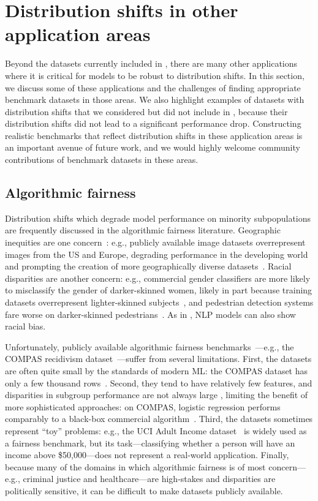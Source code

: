 \section{Distribution shifts in other application areas}\label{sec:other_datasets}
Beyond the datasets currently included in \Wilds,
there are many other applications where it is critical for models to be robust to distribution shifts.
In this section, we discuss some of these applications and the challenges of finding appropriate benchmark datasets in those areas.
We also highlight examples of datasets with distribution shifts that we considered but did not include in \Wilds, because their distribution shifts did not lead to a significant performance drop.
Constructing realistic benchmarks that reflect distribution shifts in these application areas is an important avenue of future work,
and we would highly welcome community contributions of benchmark datasets in these areas.

\subsection{Algorithmic fairness}\label{sec:fairness}
Distribution shifts which degrade model performance on minority subpopulations are frequently discussed in the algorithmic fairness literature.
Geographic inequities are one concern~\citep{shankar2017no,atwood2020inclusive}: e.g., publicly available image datasets overrepresent images from the US and Europe, degrading performance in the developing world~\citep{shankar2017no} and prompting the creation of more geographically diverse datasets~\citep{atwood2020inclusive}.
Racial disparities are another concern: e.g., commercial gender classifiers are more likely to misclassify the gender of darker-skinned women, likely in part because training datasets overrepresent lighter-skinned subjects~\citep{buolamwini2018gender}, and pedestrian detection systems fare worse on darker-skinned pedestrians~\citep{wilson2019predictive}. As in , NLP models can also show racial bias.

Unfortunately, publicly available algorithmic fairness benchmarks~\citep{mehrabi2019survey}---e.g., the COMPAS recidivism dataset~\citep{larson2016we}---suffer from several limitations.
First, the datasets are often quite small by the standards of modern ML: the COMPAS dataset has only a few thousand rows~\citep{larson2016we}.
Second, they tend to have relatively few features,
and disparities in subgroup performance are not always large \citep{larrazabal2020gender},
limiting the benefit of more sophisticated approaches:
on COMPAS, logistic regression performs comparably to a black-box commercial algorithm~\citep{jung2020limits,dressel2018accuracy}.
Third, the datasets sometimes represent ``toy'' problems: e.g., the UCI Adult Income dataset~\citep{asuncion2007uci} is widely used as a fairness benchmark, but its task---classifying whether a person will have an income above \$50,000---does not represent a real-world application.
Finally, because many of the domains in which algorithmic fairness is of most concern---e.g., criminal justice and healthcare---are high-stakes and disparities are politically sensitive, it can be difficult to make datasets publicly available.

